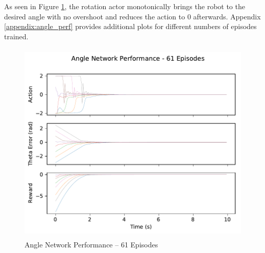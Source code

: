 As seen in Figure \ref{fig:angle_perf}, the rotation actor monotonically brings the robot to the desired angle with no overshoot and reduces the action to 0 afterwards. Appendix \ref{appendix:angle_perf} provides additional plots for different numbers of episodes trained. 
\begin{figure}[H]
	\centering
	\includegraphics[width=6in, height=3.85in, keepaspectratio]{figures/train_figs/angle_transitions/0_61.pdf}
	\caption{Angle Network Performance -- 61 Episodes}\label{fig:angle_perf}
\end{figure}

